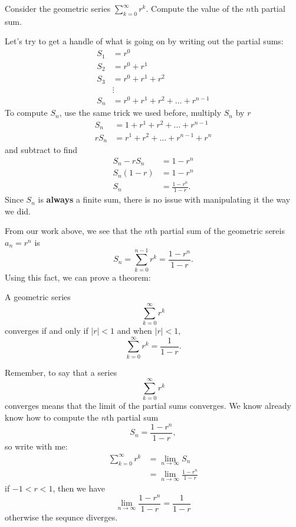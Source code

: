\documentclass{ximera}
\begin{document}
\begin{example}
  Consider the geometric series $\sum_{k=0}^\infty r^k$. Compute the
  value of the $n$th partial sum.
  \begin{explanation}
    Let's try to get a handle of what is going on by writing out the partial sums:
    \begin{align*}
      S_1 &= r^0 \\
      S_2 &= r^0 + r^1\\
      S_3 &= r^0 + r^1 + r^2\\
      &\vdots\\
      S_n &= r^0 + r^1 + r^2 + \dots + r^{n-1}
    \end{align*}
    To compute $S_n$, use the same trick we used before, multiply $S_n$ by $r$
    \begin{align*}
      S_n   &= 1 + r^1 + r^2 + \dots + r^{n-1}\\
      r S_n &= r^1 + r^2 + \dots + r^{n-1} + r^n
    \end{align*}
    and subtract to find
    \begin{align*}
      S_n - r S_n &= 1 - r^n\\
      S_n(1-r)    &= 1 - r^n\\
      S_n &= \frac{1 - r^n}{1-r}.
    \end{align*}
    Since $S_n$ is \textbf{always} a finite sum, there is no issue
    with manipulating it the way we did.
  \end{explanation}
\end{example}

From our work above, we see that the $n$th partial sum of the
geometric sereis $a_n = r^n$ is
\[
S_n = \sum_{k=0}^{n-1} r^k= \frac{1 - r^n}{1-r}.
\]
Using this fact, we can prove a theorem:
\begin{theorem}
  A geometric series
  \[
  \sum_{k= 0}^\infty r^k
  \]
  converges if and only if $|r| < 1$ and when $|r|<1$, 
  \[
  \sum_{k=0}^\infty r^k = \frac{1}{1-r}.
  \]
  \begin{explanation}
    Remember, to say that a series
    \[
    \sum_{k= 0}^\infty r^k
    \]
    converges means that the limit of the partial sums converges. We
    know already know how to compute the $n$th partial sum
    \[
    S_n = \frac{1 - r^n}{1-r},
    \]
    so write with me:
    \begin{align*}
      \sum_{k= 0}^\infty r^k &= \lim_{n\to\infty}S_n \\
      &= \lim_{n\to\infty}\frac{1 - r^n}{1-r}
    \end{align*}
    if $-1<r<1$, then we have
    \[
    \lim_{n\to\infty}\frac{1 - r^n}{1-r} = \frac{1}{1-r}
    \]
    otherwise the sequnce diverges.
  \end{explanation}
\end{theorem}
\end{document}
